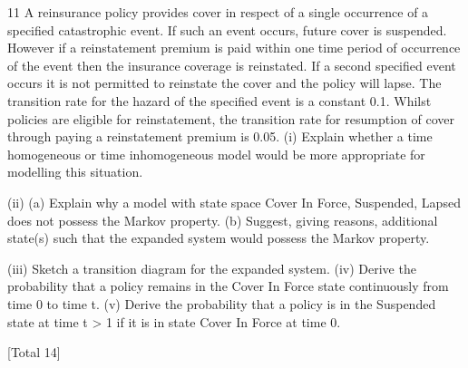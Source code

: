 

11
A reinsurance policy provides cover in respect of a single occurrence of a specified
catastrophic event. If such an event occurs, future cover is suspended. However if a
reinstatement premium is paid within one time period of occurrence of the event then
the insurance coverage is reinstated. If a second specified event occurs it is not
permitted to reinstate the cover and the policy will lapse.
The transition rate for the hazard of the specified event is a constant 0.1. Whilst
policies are eligible for reinstatement, the transition rate for resumption of cover
through paying a reinstatement premium is 0.05.
(i) Explain whether a time homogeneous or time inhomogeneous model would be
more appropriate for modelling this situation.
 
(ii) (a)
Explain why a model with state space {Cover In Force, Suspended,
Lapsed} does not possess the Markov property.
(b)
Suggest, giving reasons, additional state(s) such that the expanded
system would possess the Markov property.
 
(iii) Sketch a transition diagram for the expanded system.  
(iv) Derive the probability that a policy remains in the Cover In Force state
continuously from time 0 to time t.  
(v)
Derive the probability that a policy is in the Suspended state at time t > 1 if it
is in state Cover In Force at time 0.
 
[Total 14]


